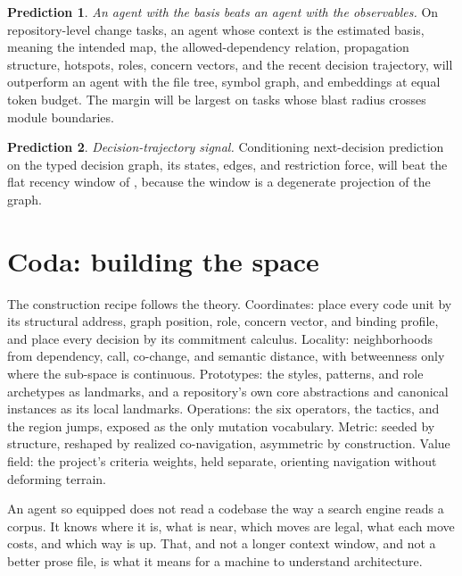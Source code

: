 \documentclass[11pt,oneside]{article}
\theoremstyle{definition}
\newtheorem{pred}{Prediction}
\begin{document}
\begin{pred}
\emph{An agent with the basis beats an agent with the observables.} On repository-level change
tasks, an agent whose context is the estimated basis, meaning the intended map, the
allowed-dependency relation, propagation structure, hotspots, roles, concern vectors, and the
recent decision trajectory, will outperform an agent with the file tree, symbol graph, and
embeddings at equal token budget. The margin will be largest on tasks whose blast radius
crosses module boundaries.
\end{pred}

\begin{pred}
\emph{Decision-trajectory signal.} Conditioning next-decision prediction on the typed decision
graph, its states, edges, and restriction force, will beat the flat recency window of
\cite{contextmatters2026}, because the window is a degenerate projection of the graph.
\end{pred}

\section{Coda: building the space}

The construction recipe follows the theory. Coordinates: place every code unit by its
structural address, graph position, role, concern vector, and binding profile, and place every
decision by its commitment calculus. Locality: neighborhoods from dependency, call, co-change,
and semantic distance, with betweenness only where the sub-space is continuous. Prototypes: the
styles, patterns, and role archetypes as landmarks, and a repository's own core abstractions
and canonical instances as its local landmarks. Operations: the six operators, the tactics, and
the region jumps, exposed as the only mutation vocabulary. Metric: seeded by structure,
reshaped by realized co-navigation, asymmetric by construction. Value field: the project's
criteria weights, held separate, orienting navigation without deforming terrain.

An agent so equipped does not read a codebase the way a search engine reads a corpus. It knows
where it is, what is near, which moves are legal, what each move costs, and which way is up.
That, and not a longer context window, and not a better prose file, is what it means for a
machine to understand architecture.
\end{document}
